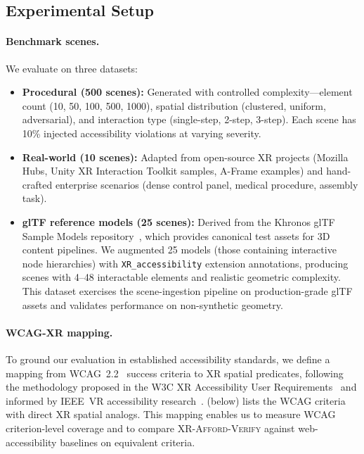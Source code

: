 \documentclass[11pt,letterpaper]{article}
\newcommand{\tool}{\textsc{XR-Afford-Verify}}
\begin{document}
\subsection{Experimental Setup}

\paragraph{Benchmark scenes.}
We evaluate on three datasets:
\begin{itemize}[nosep]
  \item \textbf{Procedural (500 scenes):} Generated with controlled complexity---element count (10, 50, 100, 500, 1000), spatial distribution (clustered, uniform, adversarial), and interaction type (single-step, 2-step, 3-step).
  Each scene has 10\% injected accessibility violations at varying severity.
  \item \textbf{Real-world (10 scenes):} Adapted from open-source XR projects (Mozilla Hubs, Unity XR Interaction Toolkit samples, A-Frame examples) and hand-crafted enterprise scenarios (dense control panel, medical procedure, assembly task).
  \item \textbf{glTF reference models (25 scenes):} Derived from the Khronos glTF Sample Models repository~\cite{gltf-samples}, which provides canonical test assets for 3D content pipelines.
  We augmented 25 models (those containing interactive node hierarchies) with \texttt{XR\_accessibility} extension annotations, producing scenes with 4--48 interactable elements and realistic geometric complexity.
  This dataset exercises the scene-ingestion pipeline on production-grade glTF assets and validates performance on non-synthetic geometry.
\end{itemize}

\paragraph{WCAG-XR mapping.}
To ground our evaluation in established accessibility standards, we define a mapping from WCAG~2.2~\cite{wcag22} success criteria to XR spatial predicates, following the methodology proposed in the W3C XR Accessibility User Requirements~\cite{w3c-xaur} and informed by IEEE~VR accessibility research~\cite{ieee-vr-a11y,mott2019}.
 (below) lists the WCAG criteria with direct XR spatial analogs.
This mapping enables us to measure WCAG criterion-level coverage and to compare \tool{} against web-accessibility baselines on equivalent criteria.
\end{document}
